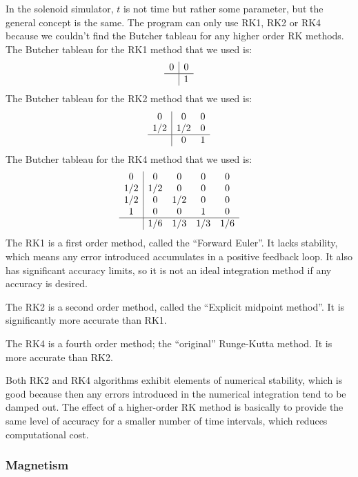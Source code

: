 \documentclass[12pt]{article}
\begin{document}
	In the solenoid simulator, $t$ is not time but rather some parameter, but the general concept is the same. The program can only use RK1, RK2 or RK4 because we couldn't find the Butcher tableau for any higher order RK methods. The Butcher tableau for the RK1 method that we used is:
			\[\begin{array}{c|c}
				0 & 0 \\
				\hline
  				  & 1 \\
			\end{array}\]			
	The Butcher tableau for the RK2 method that we used is:	
			\[\begin{array}{c|cc}
				0   & 0   & 0  \\
				1/2 & 1/2 & 0  \\
				\hline
    				& 0   & 1  \\
			\end{array}\]			
	The Butcher tableau for the RK4 method that we used is:
			\[\begin{array}{c|cccc}
				0   & 0   & 0   & 0   & 0\\
				1/2 & 1/2 & 0   & 0   & 0\\
				1/2 & 0   & 1/2 & 0   & 0\\
				1   & 0   & 0   & 1   & 0\\
				\hline
    				& 1/6 & 1/3 & 1/3 & 1/6\\
			\end{array}\]
	The RK1 is a first order method, called the ``Forward Euler''. It lacks stability, which means any error introduced accumulates in a positive feedback loop. It also has significant accuracy limits, so it is not an ideal integration method if any accuracy is desired.
	
	The RK2 is a second order method, called the ``Explicit midpoint method''. It is significantly more accurate than RK1. 
	
	The RK4 is a fourth order method; the ``original'' Runge-Kutta method. It is more accurate than RK2.
	
	Both RK2 and RK4 algorithms exhibit elements of numerical stability, which is good because then any errors introduced in the numerical integration tend to be damped out. The effect of a higher-order RK method is basically to provide the same level of accuracy for a smaller number of time intervals, which reduces computational cost. 
	
	\subsubsection*{Magnetism}
	
\end{document}
